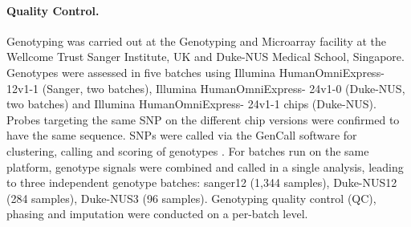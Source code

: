 \paragraph{Quality Control.}Genotyping was carried out at the Genotyping and Microarray facility at the Wellcome Trust Sanger Institute, UK and Duke-NUS Medical School, Singapore. Genotypes were assessed in five batches using Illumina HumanOmniExpress- 12v1-1 (Sanger, two batches), Illumina HumanOmniExpress- 24v1-0 (Duke-NUS, two batches) and Illumina HumanOmniExpress- 24v1-1 chips (Duke-NUS). Probes targeting the same SNP on the different chip versions were confirmed to have the same sequence. SNPs were called via the GenCall software for clustering, calling and scoring of genotypes \citep{Teo2007}. For batches run on the same platform, genotype signals were combined and called in a single analysis, leading to three independent genotype batches: sanger12 (1,344 samples), Duke-NUS12 (284 samples), Duke-NUS3 (96 samples). Genotyping quality control (QC), phasing and imputation were conducted on a per-batch level. 

